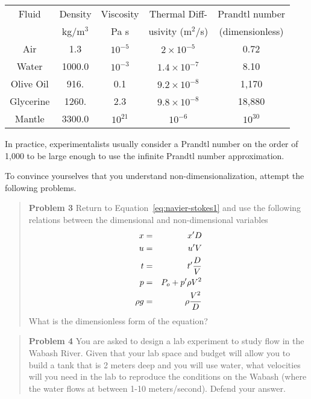 \documentclass[12pt,twoside]{article}
\begin{document}
\begin{center}
\begin{tabular}{||c|c|c|c|c||} \hline
Fluid     & Density  & Viscosity & Thermal Diff-     & Prandtl number \\
          & kg/m$^3$ &  Pa s     & usivity (m$^2$/s) & (dimensionless)\\ \hline 
Air       &  1.3     & $10^{-5}$ & $2\times 10^{-5}$ &   0.72         \\
Water     & 1000.0   & $10^{-3}$ &$1.4\times 10^{-7}$&   8.10         \\
Olive Oil &  916.    &  0.1      &$9.2\times 10^{-8}$& 1,170          \\
Glycerine &  1260.   & 2.3       &$9.8\times 10^{-8}$& 18,880         \\
Mantle    & 3300.0   & $10^{21}$ &  $10^{-6}$        & $10^{30}$      \\ \hline
\end{tabular}
\end{center}

In practice, experimentalists usually consider a Prandtl number on the order of
1,000 to be large enough to use the infinite Prandtl number approximation.

\bigskip
To convince yourselves that you understand non-dimensionalization, attempt the
following problems.

\begin{quote} {\bf Problem 3} Return to Equation~\ref{eq:navier-stokes1} and use
the following relations between the dimensional and non-dimensional variables
\begin{eqnarray} 
x & = & x^\prime D \\ 
u & = & u^\prime {V} \\ 
t & = & t^\prime {D\over V} \\
p & = & P_o + p^\prime {\rho V^2} \\
\rho g & = & \rho {V^2 \over D}
\end{eqnarray}
What is the dimensionless form of the equation?  
\end{quote}

\begin{quote} {\bf Problem 4} You are asked to design a lab experiment to study
flow in the Wabash River.   Given that your lab space and budget will allow
you to build a tank that is 2 meters deep and you will use water, what
velocities will you need in the lab to reproduce the conditions on the Wabash
(where the water flows at between 1-10 meters/second).   Defend your answer.
\end{quote}
\end{document}
